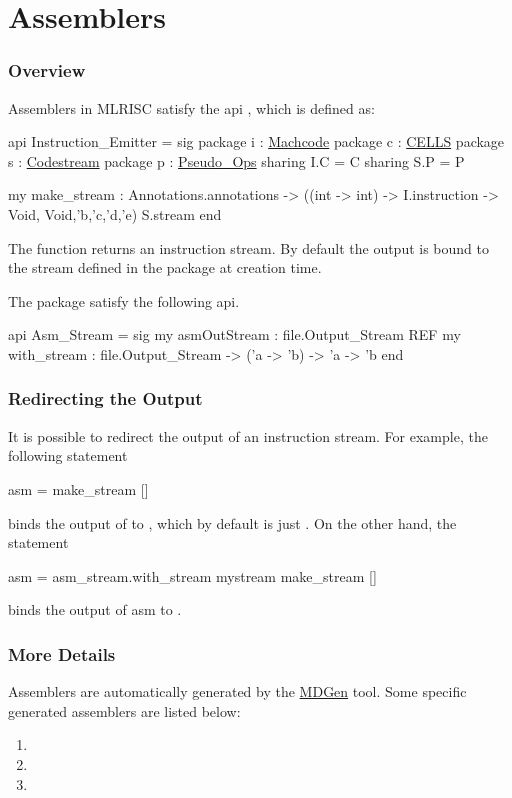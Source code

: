\section{Assemblers}

\subsubsection{Overview}
Assemblers in MLRISC satisfy the api 
,
which is defined as:
\begin{SML}
api Instruction_Emitter =
sig
   package i : \href{instructions.html}{Machcode}
   package c : \href{cells.html}{CELLS}
   package s : \href{streams.html}{Codestream}
   package p : \href{pseudo-ops.html}{Pseudo_Ops}
      sharing I.C = C
      sharing S.P = P

   my make_stream : Annotations.annotations ->
                     ((int -> int) -> I.instruction -> Void,
                      Void,'b,'c,'d,'e) S.stream
end
\end{SML}

The function  returns an instruction stream.
By default the output is bound to the stream  
defined in the package 
 at creation time.

The package  satisfy the following api.
\begin{SML}
api Asm_Stream = sig
  my asmOutStream : file.Output_Stream REF
  my with_stream : file.Output_Stream -> ('a -> 'b) -> 'a -> 'b
end
\end{SML}
\subsubsection{Redirecting the Output}
It is possible to redirect the output of an instruction stream.
For example, the following statement
\begin{SML}
   asm = make_stream []
\end{SML}
binds the output of  to , which
by default is just .  On the other hand, the
statement
\begin{SML}
   asm = asm_stream.with_stream mystream make_stream []
\end{SML}
binds the output of asm to .

\subsubsection{More Details}

Assemblers are automatically generated by the 
\href{mlrisc-md.html}{MDGen} tool.  Some specific generated
assemblers are listed below:
\begin{enumerate}
 \item {}
 \item {}
 \item {}
\end{enumerate}
